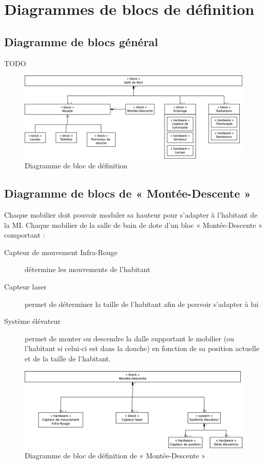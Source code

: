 \chapter{Diagrammes de blocs de définition}
\section{Diagramme de blocs général}
TODO 
\begin{figure}[H]
	\centering
	\includegraphics[width=1\linewidth]{diagrams/bathroom/diagramme_blocks_bdd.eps}
	\caption{Diagramme de bloc de définition}
	\label{fig:diagramme_bdd}
\end{figure}

\section{Diagramme de blocs de « Montée-Descente »}
Chaque mobilier doit pouvoir moduler sa hauteur pour s'adapter à l'habitant de la MI. Chaque mobilier de la salle de bain de dote d'un bloc « Montée-Descente » comportant :
\begin{description}
	\item[Capteur de mouvement Infra-Rouge] détermine les mouvements de l'habitant
	\item[Capteur laser] permet de déterminer la taille de l'habitant afin de pouvoir s'adapter à lui
	\item[Système élévateur] permet de monter ou descendre la dalle supportant le mobilier (ou l'habitant si celui-ci est dans la douche) en fonction de sa position actuelle et de la taille de l'habitant.   
\end{description}

\begin{figure}[H]
	\centering
	\includegraphics[width=1\linewidth]{diagrams/bathroom/diagramme_blocks_bdd2.eps}
	\caption{Diagramme de bloc de définition de « Montée-Descente »}
	\label{fig:diagramme_bdd2}
\end{figure}
